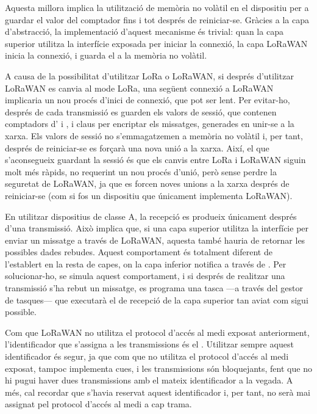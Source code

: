 \documentclass{tfgitic}[2024/07/01]
\begin{document}
{Aquesta millora implica la utilització de memòria no volàtil en el dispositiu per a guardar el valor del comptador fins i tot després de reiniciar-se. Gràcies a la capa d'abstracció, la implementació d'aquest mecanisme és trivial: quan la capa superior utilitza la interfície exposada per iniciar la connexió, la capa LoRaWAN inicia la connexió, i guarda el  a la memòria no volàtil.

A causa de la possibilitat d'utilitzar LoRa o LoRaWAN, si després d'utilitzar LoRaWAN es canvia al mode LoRa, una següent connexió a LoRaWAN implicaria un nou procés d'inici de connexió, que pot ser lent. Per evitar-ho, després de cada transmissió es guarden els valors de sessió, que contenen comptadors d' i , i claus per encriptar els missatges, generades en unir-se a la xarxa. Els valors de sessió no s'emmagatzemen a memòria no volàtil i, per tant, després de reiniciar-se es forçarà una nova unió a la xarxa. Així, el que s'aconsegueix guardant la sessió és que els canvis entre LoRa i LoRaWAN siguin molt més ràpids, no requerint un nou procés d'unió, però sense perdre la seguretat de LoRaWAN, ja que es forcen noves unions a la xarxa després de reiniciar-se (com si fos un dispositiu que únicament implementa LoRaWAN).

En utilitzar dispositius de classe A, la recepció es produeix únicament després d'una transmissió. Això implica que, si una capa superior utilitza la interfície per enviar un missatge a través de LoRaWAN, aquesta també hauria de retornar les possibles dades rebudes. Aquest comportament és totalment diferent de l'establert en la resta de capes, on la capa inferior notifica a través de . Per solucionar-ho, se simula aquest comportament, i si després de realitzar una transmissió s'ha rebut un missatge, es programa una tasca ---a través del gestor de tasques--- que executarà el  de recepció de la capa superior tan aviat com sigui possible. 

Com que LoRaWAN no utilitza el protocol d'accés al medi exposat anteriorment, l'identificador que s'assigna a les transmissions és el . Utilitzar sempre aquest identificador és segur, ja que com que no utilitza el protocol d'accés al medi exposat, tampoc implementa cues, i les transmissions són bloquejants, fent que no hi pugui haver dues transmissions amb el mateix identificador a la vegada. A més, cal recordar que s'havia reservat aquest identificador i, per tant, no serà mai assignat pel protocol d'accés al medi a cap trama.

}
\end{document}
